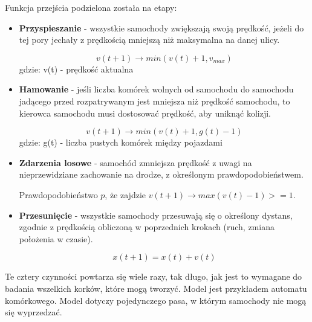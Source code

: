 \documentclass{sprawozdanie-agh}
\begin{document}
	Funkcja przejścia podzielona została na etapy:

	\begin{itemize}
		\item{\textbf{Przyspieszanie} - wszystkie samochody zwiększają swoją prędkość, jeżeli do tej pory jechały z prędkością mniejszą niż maksymalna na danej ulicy.}

		\begin{equation}
			v(t+1) \rightarrow min(v(t)+1,v_{max})
		\end{equation}
		gdzie: v(t) - prędkość aktualna

		\item{\textbf{Hamowanie} - jeśli liczba komórek wolnych od samochodu do samochodu jadącego przed rozpatrywanym jest mniejsza niż prędkość samochodu, to kierowca samochodu musi dostosować prędkość, aby uniknąć kolizji.}

		\begin{equation}
			v(t+1) \rightarrow min(v(t)+1,g(t)-1)
		\end{equation}
		gdzie: g(t) - liczba pustych komórek między pojazdami

		\item{\textbf{Zdarzenia losowe} - samochód zmniejsza prędkość z uwagi na nieprzewidziane zachowanie na drodze, z określonym prawdopodobieństwem.}

		Prawdopodobieństwo $p$, że zajdzie $v(t+1) \rightarrow max(v(t)-1)>=1$.

		\item{\textbf{Przesunięcie} - wszystkie samochody przesuwają się o określony dystans, zgodnie z prędkością obliczoną w poprzednich krokach (ruch, zmiana położenia w czasie).}

		\begin{equation}
			x(t+1)=x(t)+v(t)
		\end{equation}

	\end{itemize}

	Te cztery czynności powtarza się wiele razy, tak długo, jak jest to wymagane do badania wszelkich korków, które mogą tworzyć. Model jest przykładem automatu komórkowego. Model dotyczy pojedynczego pasa, w którym samochody nie mogą się wyprzedzać.
\end{document}

